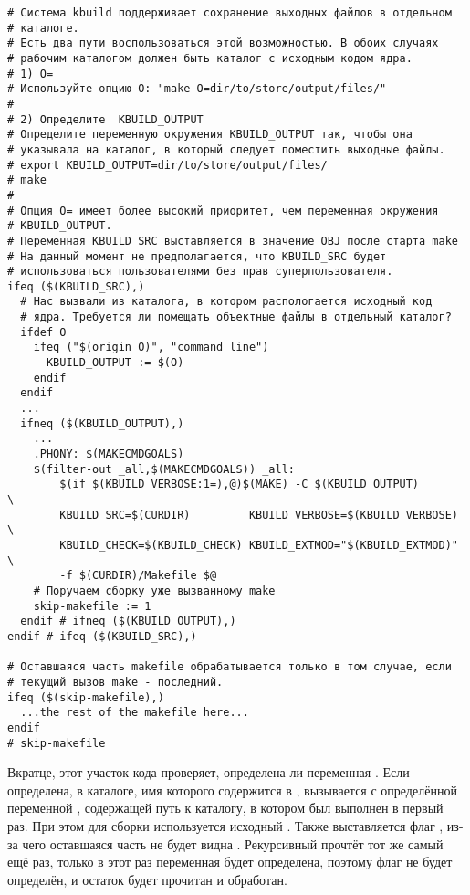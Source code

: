 \begin{verbatim}
# Система kbuild поддерживает сохранение выходных файлов в отдельном
# каталоге.
# Есть два пути воспользоваться этой возможностью. В обоих случаях
# рабочим каталогом должен быть каталог с исходным кодом ядра.
# 1) O=
# Используйте опцию O: "make O=dir/to/store/output/files/"
#
# 2) Определите  KBUILD_OUTPUT
# Определите переменную окружения KBUILD_OUTPUT так, чтобы она
# указывала на каталог, в который следует поместить выходные файлы.
# export KBUILD_OUTPUT=dir/to/store/output/files/
# make
#
# Опция O= имеет более высокий приоритет, чем переменная окружения
# KBUILD_OUTPUT.
# Переменная KBUILD_SRC выставляется в значение OBJ после старта make
# На данный момент не предполагается, что KBUILD_SRC будет
# использоваться пользователями без прав суперпользователя.
ifeq ($(KBUILD_SRC),)
  # Нас вызвали из каталога, в котором распологается исходный код
  # ядра. Требуется ли помещать объектные файлы в отдельный каталог?
  ifdef O
    ifeq ("$(origin O)", "command line")
      KBUILD_OUTPUT := $(O)
    endif
  endif
  ...
  ifneq ($(KBUILD_OUTPUT),)
    ...
    .PHONY: $(MAKECMDGOALS)
    $(filter-out _all,$(MAKECMDGOALS)) _all:
        $(if $(KBUILD_VERBOSE:1=),@)$(MAKE) -C $(KBUILD_OUTPUT)       \
        KBUILD_SRC=$(CURDIR)         KBUILD_VERBOSE=$(KBUILD_VERBOSE) \
        KBUILD_CHECK=$(KBUILD_CHECK) KBUILD_EXTMOD="$(KBUILD_EXTMOD)" \
        -f $(CURDIR)/Makefile $@
    # Поручаем сборку уже вызванному make
    skip-makefile := 1
  endif # ifneq ($(KBUILD_OUTPUT),)
endif # ifeq ($(KBUILD_SRC),)

# Оставшаяся часть makefile обрабатывается только в том случае, если
# текущий вызов make - последний.
ifeq ($(skip-makefile),)
  ...the rest of the makefile here...
endif
# skip-makefile
\end{verbatim}

Вкратце, этот участок кода проверяет, определена ли переменная
. Если определена, в каталоге, имя которого
содержится в , вызывается \GNUmake{} с
определённой переменной \variable{KBUILD\_SRC}, содержащей путь
к каталогу, в котором \GNUmake{} был выполнен в первый раз. При этом
для сборки используется исходный \Makefile{}. Также выставляется флаг
\variable{skip-makefile}, из-за чего оставшаяся часть  не
будет видна \GNUmake{}. Рекурсивный \GNUmake{} прочтёт тот же самый
\Makefile{} ещё раз, только в этот раз переменная
\variable{KBUILD\_SRC} будет определена, поэтому флаг
\variable{skip-makefile} не будет определён, и остаток \makefile{а}
будет прочитан и обработан.

